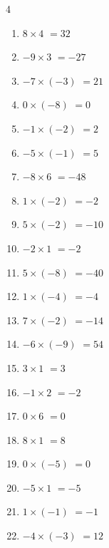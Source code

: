 \begin{multicols}{4}
\begin{enumerate}
  \item $8\times 4$
        $=32$

  \item $-9\times 3$
        $=-27$

  \item $-7\times (-3)$
        $=21$

  \item $0\times (-8)$
        $=0$

  \item $-1\times (-2)$
        $=2$

  \item $-5\times (-1)$
        $=5$

  \item $-8\times 6$
        $=-48$

  \item $1\times (-2)$
        $=-2$

  \item $5\times (-2)$
        $=-10$

  \item $-2\times 1$
        $=-2$

  \item $5\times (-8)$
        $=-40$

\columnbreak %

  \item $1\times (-4)$
        $=-4$

  \item $7\times (-2)$
        $=-14$

  \item $-6\times (-9)$
        $=54$

  \item $3\times 1$
        $=3$

  \item $-1\times 2$
        $=-2$

  \item $0\times 6$
        $=0$

  \item $8\times 1$
        $=8$

  \item $0\times (-5)$
        $=0$

  \item $-5\times 1$
        $=-5$

  \item $1\times (-1)$
        $=-1$

  \item $-4\times (-3)$
        $=12$


\end{enumerate}
\end{multicols}
